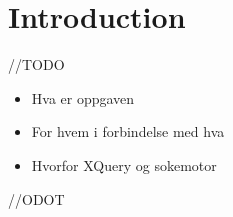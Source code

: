 \chapter{Introduction}
//TODO
\begin{itemize}
\item Hva er oppgaven
\item For hvem i forbindelse med hva
\item Hvorfor XQuery og sokemotor
\end{itemize}


//ODOT